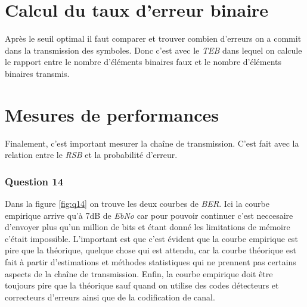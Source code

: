\documentclass[a4paper,11pt]{article}
\begin{document}
\section{Calcul du taux d'erreur binaire}
Après le seuil optimal il faut comparer et trouver combien d'erreurs on a commit dans la transmission des symboles. Donc c'est avec le \emph{TEB} dans lequel on calcule le rapport entre le nombre d'éléments binaires faux et le nombre d'éléments binaires transmis.
\section{Mesures de performances}
Finalement, c'est important mesurer la chaîne de transmission. C'est fait avec la relation entre le \emph{RSB} et la probabilité d'erreur.
\subsubsection*{Question 14}
Dans la figure \ref{fig:q14} on trouve les deux courbes de \emph{BER}. Ici la courbe empirique arrive qu'à 7dB de \emph{EbNo} car pour pouvoir continuer c'est neccesaire d'envoyer plus qu'un million de bits et étant donné les limitations de mémoire c'était impossible. L'important est que c'est évident que la courbe empirique est pire que la théorique, quelque chose qui est attendu, car la courbe théorique est fait à partir d'estimations et méthodes statistiques qui ne prennent pas certains aspects de la chaîne de transmission. Enfin, la courbe empirique doit être toujours pire que la théorique sauf quand on utilise des codes détecteurs et correcteurs d'erreurs ainsi que de la codification de canal.
\end{document}
